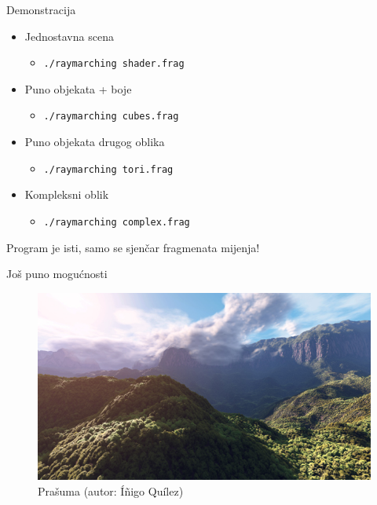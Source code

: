 \documentclass[12pt]{beamer}
\begin{document}
  \begin{frame}{Demonstracija}
    \begin{itemize}
    \item Jednostavna scena
      \begin{itemize}
        \item \texttt{./raymarching shader.frag}
      \end{itemize}
    \item Puno objekata + boje
      \begin{itemize}
        \item \texttt{./raymarching cubes.frag}
      \end{itemize}
    \item Puno objekata drugog oblika
      \begin{itemize}
        \item \texttt{./raymarching tori.frag}
      \end{itemize}
    \item Kompleksni oblik
      \begin{itemize}
        \item \texttt{./raymarching complex.frag}
      \end{itemize}
    \end{itemize}

    Program je isti, samo se sjenčar fragmenata mijenja!
  \end{frame}

  \begin{frame}{Još puno mogućnosti}
    \begin{figure}
      \includegraphics[width=\textwidth,height=\textheight,keepaspectratio]{rainforest.jpg}
      \caption{Prašuma (autor: Íñigo Quílez)}
    \end{figure}
  \end{frame}
\end{document}
